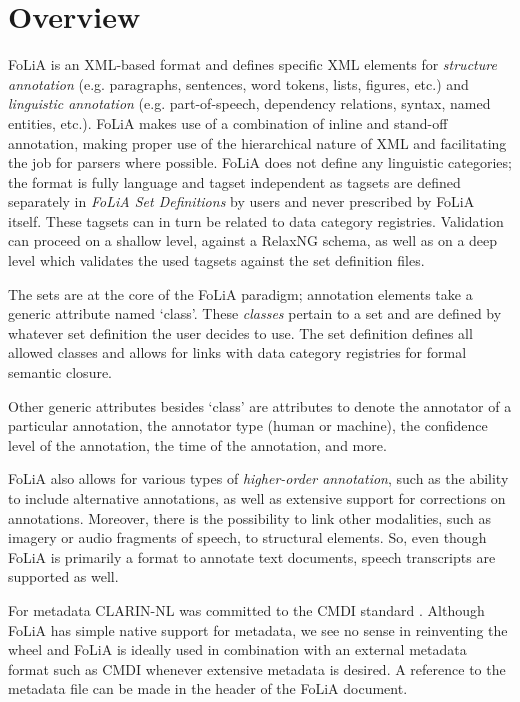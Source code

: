\documentclass[a4paper,11pt]{article}
\begin{document}
\section{Overview}
\label{sec:overview}

FoLiA is an XML-based format and defines specific XML elements for
\emph{structure annotation} (e.g. paragraphs, sentences, word tokens, lists,
figures, etc.) and \emph{linguistic annotation} (e.g. part-of-speech,
dependency relations, syntax, named entities, etc.). FoLiA makes use of a
combination of inline and stand-off annotation, making proper use of the
hierarchical nature of XML and facilitating the job for parsers where possible.
FoLiA does not define any linguistic categories; the format is fully language
and tagset independent as tagsets are defined separately in \emph{FoLiA Set
Definitions} by users and never prescribed by FoLiA itself. These tagsets can in turn
be related to data category registries. Validation can proceed on a shallow
level, against a RelaxNG schema, as well as on a deep level which validates the
used tagsets against the set definition files.

The sets are at the core of the FoLiA paradigm; annotation elements take a
generic attribute named `class'. These \emph{classes} pertain to a set and are
defined by whatever set definition the user decides to use. The set definition
defines all allowed classes and allows for links with data category registries
for formal semantic closure.

Other generic attributes besides `class' are attributes to denote the
annotator of a particular annotation, the annotator type (human or machine),
the confidence level of the annotation, the time of the annotation, and more.

FoLiA also allows for various types of \emph{higher-order annotation}, such as
the ability to include alternative annotations, as well as extensive support
for corrections on annotations. Moreover, there is the possibility to link other
modalities, such as imagery or audio fragments of speech, to structural elements. So, even
though FoLiA is primarily a format to annotate text documents, speech
transcripts are supported as well.

For metadata CLARIN-NL was committed to the CMDI standard \cite{CMDI}.
Although FoLiA has simple native support for metadata, we see no
sense in reinventing the wheel and FoLiA is ideally used in combination with an
external metadata format such as CMDI whenever extensive metadata is desired. A
reference to the metadata file can be made in the header of the FoLiA document.
\end{document}
